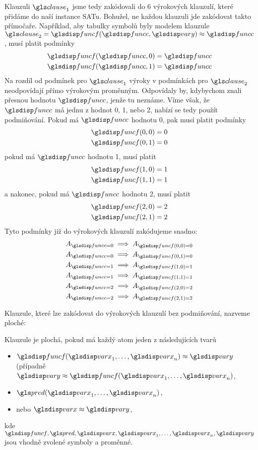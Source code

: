 Klauzuli $\clause_1$ jsme tedy zakódovali do 6 výrokových klauzulí,
které přidáme do naší instance SATu.
Bohužel, ne každou klauzuli jde zakódovat takto přímočaře.
Například, aby tabulky symbolů byly modelem klauzule
$\clause_2 = \func(\funcC, \varY) \approx \funcC$, musí platit podmínky
\begin{gather*}
  \func(\funcC, 0) = \funcC \\
  \func(\funcC, 1) = \funcC
\end{gather*}
Na rozdíl od podmínek pro $\clause_1$ výroky v podmínkách pro $\clause_2$
neodpovídají přímo výrokovým proměnným.
Odpovídaly by, kdybychom znali přesnou hodnotu $\funcC$, jenže tu neznáme.
Víme však, že $\funcC$ má jednu z hodnot 0, 1, nebo 2, nabízí se tedy
použít podmiňování. Pokud má $\funcC$ hodnotu 0, pak musí platit
podmínky
\begin{gather*}
  \func(0, 0) = 0 \\
  \func(0, 1) = 0
\end{gather*}
pokud má $\funcC$ hodnotu 1, musí platit
\begin{gather*}
  \func(1, 0) = 1 \\
  \func(1, 1) = 1
\end{gather*}
a nakonec, pokud má $\funcC$ hodnotu 2, musí platit
\begin{gather*}
  \func(2, 0) = 2 \\
  \func(2, 1) = 2
\end{gather*}
Tyto podmínky již do výrokových klauzulí zakódujeme snadno:
\begin{gather*}
  A_{\funcC = 0} \implies A_{\func(0, 0) = 0} \\
  A_{\funcC = 0} \implies A_{\func(0, 1) = 0} \\
  A_{\funcC = 1} \implies A_{\func(1, 0) = 1} \\
  A_{\funcC = 1} \implies A_{\func(1, 1) = 1} \\
  A_{\funcC = 2} \implies A_{\func(2, 0) = 2} \\
  A_{\funcC = 2} \implies A_{\func(2, 1) = 2}
\end{gather*}

Klauzule, které lze zakódovat do výrokových klauzulí
bez podmiňování, nazveme ploché:

\begin{defn}
Klauzule je plochá, pokud má každý atom jeden z následujících tvarů
\begin{itemize}
\item $\func(\var_1 \comdots \var_n) \approx \varY$
  (případně $\varY \approx \func(\var_1 \comdots \var_n)$,
\item $\pred(\var_1 \comdots \var_n)$,
\item nebo $\var \approx \varY$,
\end{itemize}
kde $\func, \pred, \var, \var_1 \comdots \var_n, \varY$ jsou
vhodně zvolené symboly a proměnné.
\end{defn}

